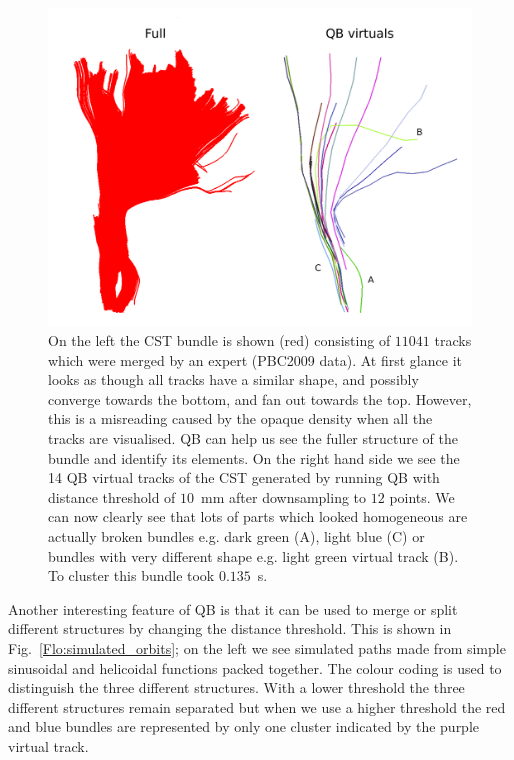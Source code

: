 \documentclass[preprint,authoryear,a4paper,10pt,onecolumn]{elsarticle}
\begin{document}
%
\begin{figure}
\begin{centering}
\includegraphics[scale=0.3]{last_figures/cst_simplification}
\par\end{centering}
\caption{On the left the CST bundle is shown (red) consisting of $11041$
  tracks which were merged by an expert (PBC2009 data). At first glance
  it looks as though all tracks have a similar shape, and possibly
  converge towards the bottom, and fan out towards the top. However,
  this is a misreading caused by the opaque density when all the tracks
  are visualised.  QB can help us see the fuller structure of the bundle
  and identify its elements. On the right hand side we see the 14 QB
  virtual tracks of the CST generated by running QB with distance
  threshold of $10$~mm after downsampling to $12$ points. We can now
  clearly see that lots of parts which looked homogeneous are actually
  broken bundles e.g. dark green (A), light blue (C) or bundles with
  very different shape e.g. light green virtual track (B). To cluster
  this bundle took $0.135$~s.\label{Flo:cst_pbc}}
\end{figure}

Another interesting feature of QB is that it can be used to merge or
split different structures by changing the distance threshold.  This is
shown in Fig.~\ref{Flo:simulated_orbits}; on the left we see simulated
paths made from simple sinusoidal and helicoidal functions packed
together. The colour coding is used to distinguish the three different
structures. With a lower threshold the three different structures remain
separated but when we use a higher threshold the red and blue bundles
are represented by only one cluster indicated by the purple virtual
track.
\end{document}
